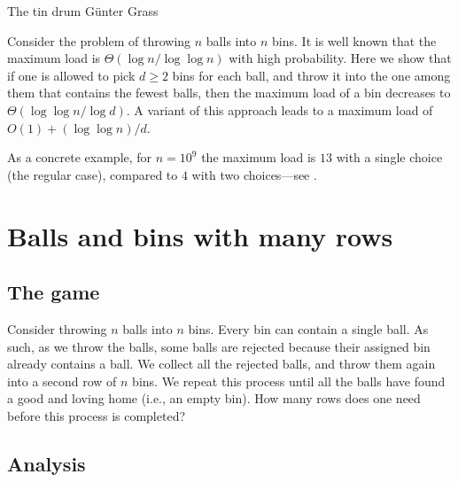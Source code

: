 %


\ChapterPrefix{}%
\ChapterGen{}


%
{The tin drum}%
{G{\"u}nter Grass}%

\bigskip%
\noindent%
Consider the problem of throwing $n$ balls into $n$ bins. It is well
known that the maximum load is $\Theta( \log n / \log \log n)$ with high
probability. Here we show that if one is allowed to pick {$d \geq 2$ bins
   for each ball, and throw it into the one among them that contains the
   fewest balls,} then the maximum load of a bin decreases to
$\Theta( \log \log n/ \log d)$. A variant of this approach leads to a maximum
load of {$O(1) + (\log \log n)/ d$.}

As a concrete example, for $n=10^9$ the maximum load is $13$ with a
single choice (the regular case), compared to $4$ with two choices---see
.




\section{Balls and bins with many rows}
%

\subsection{The game}

Consider throwing $n$ balls into $n$ bins. Every bin can contain a
single ball. As such, as we throw the balls, some balls are
rejected because their assigned bin already contains a ball. We
collect all the rejected balls, and throw them again into a second row
of $n$ bins. We repeat this process until all the balls have found a
good and loving home (i.e., an empty bin). How many rows does one need
before this process is completed?

\subsection{Analysis}


